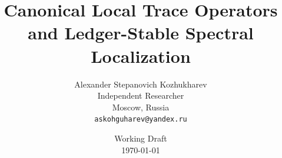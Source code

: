 
\title{
  Canonical Local Trace Operators\\
  and Ledger-Stable Spectral Localization
}

\author{
  Alexander Stepanovich Kozhukharev\\
  Independent Researcher\\
  Moscow, Russia\\
  \texttt{askohguharev@yandex.ru}
}

\date{
  Working Draft\\
  \today
}


\newcommand{\PaperTitle}{Canonical Local Trace Operators and Ledger-Stable Spectral Localization}

\newcommand{\PaperShortTitle}{Canonical Local Trace Operators}

\newcommand{\PaperAuthor}{Alexander Stepanovich Kozhukharev}

\newcommand{\PaperKeywords}{
Selberg trace formula;
localized trace formula;
spectral theory;
hyperbolic surfaces;
microlocal analysis;
semiclassical analysis;
error ledgers;
refinement stability;
local Weyl law;
trace-to-zeta interfaces
}

\newcommand{\PaperMSC}{
Primary 11F72, 58J50;
Secondary 35P20, 53C22, 58J40
}
